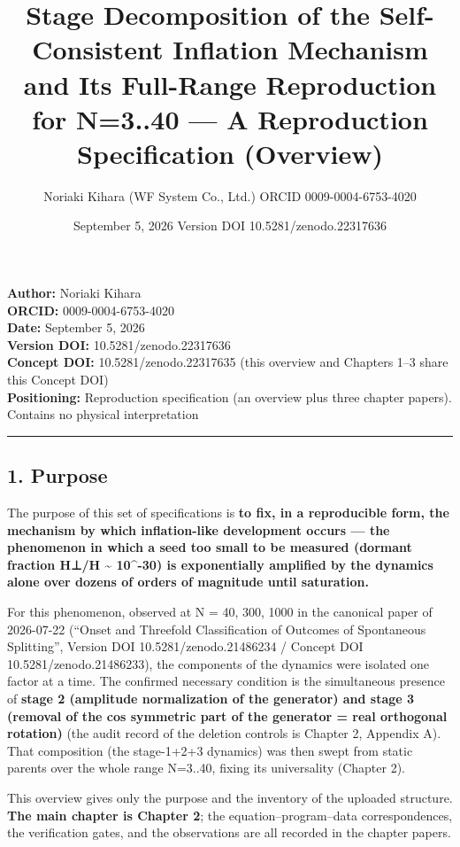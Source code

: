\documentclass[
  a4paper,
]{ltjsarticle}
\title{Stage Decomposition of the Self-Consistent Inflation Mechanism
and Its Full-Range Reproduction for N=3..40 --- A Reproduction
Specification (Overview)}
\author{Noriaki Kihara (WF System Co., Ltd.) ORCID 0009-0004-6753-4020}
\date{September 5, 2026 Version DOI 10.5281/zenodo.22317636}
\begin{document}
\maketitle

\textbf{Author:} Noriaki Kihara\\
\textbf{ORCID:} 0009-0004-6753-4020\\
\textbf{Date:} September 5, 2026\\
\textbf{Version DOI:} 10.5281/zenodo.22317636\\
\textbf{Concept DOI:} 10.5281/zenodo.22317635 (this overview and
Chapters 1--3 share this Concept DOI)\\
\textbf{Positioning:} Reproduction specification (an overview plus three
chapter papers). Contains no physical interpretation

\begin{center}\rule{0.5\linewidth}{0.5pt}\end{center}

\subsection{1. Purpose}\label{purpose}

The purpose of this set of specifications is \textbf{to fix, in a
reproducible form, the mechanism by which inflation-like development
occurs --- the phenomenon in which a seed too small to be measured
(dormant fraction H⊥/H \textasciitilde{} 10\^{}-30) is exponentially
amplified by the dynamics alone over dozens of orders of magnitude until
saturation.}

For this phenomenon, observed at N = 40, 300, 1000 in the canonical
paper of 2026-07-22 (``Onset and Threefold Classification of Outcomes of
Spontaneous Splitting'', Version DOI 10.5281/zenodo.21486234 / Concept
DOI 10.5281/zenodo.21486233), the components of the dynamics were
isolated one factor at a time. The confirmed necessary condition is the
simultaneous presence of \textbf{stage 2 (amplitude normalization of the
generator) and stage 3 (removal of the cos symmetric part of the
generator = real orthogonal rotation)} (the audit record of the deletion
controls is Chapter 2, Appendix A). That composition (the stage-1+2+3
dynamics) was then swept from static parents over the whole range
N=3..40, fixing its universality (Chapter 2).

This overview gives only the purpose and the inventory of the uploaded
structure. \textbf{The main chapter is Chapter 2}; the
equation--program--data correspondences, the verification gates, and the
observations are all recorded in the chapter papers.
\end{document}
